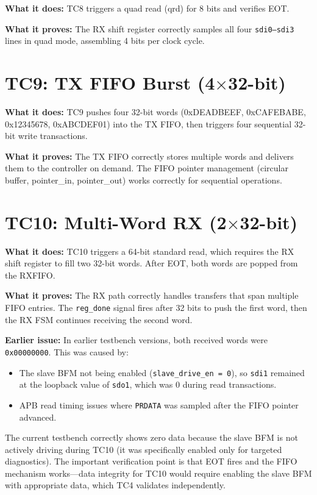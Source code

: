 \textbf{What it does:} TC8 triggers a quad read (qrd) for 8 bits and verifies EOT.

\textbf{What it proves:} The RX shift register correctly samples all four \texttt{sdi0--sdi3}
lines in quad mode, assembling 4 bits per clock cycle.

\section{TC9: TX FIFO Burst (4$\times$32-bit)}

\textbf{What it does:} TC9 pushes four 32-bit words (0xDEADBEEF, 0xCAFEBABE, 0x12345678,
0xABCDEF01) into the TX FIFO, then triggers four sequential 32-bit write transactions.

\textbf{What it proves:} The TX FIFO correctly stores multiple words and delivers them to the
controller on demand. The FIFO pointer management (circular buffer, pointer\_in, pointer\_out)
works correctly for sequential operations.

\section{TC10: Multi-Word RX (2$\times$32-bit)}
\label{sec:tc10}

\textbf{What it does:} TC10 triggers a 64-bit standard read, which requires the RX shift register
to fill two 32-bit words. After EOT, both words are popped from the RXFIFO.

\textbf{What it proves:} The RX path correctly handles transfers that span multiple FIFO entries.
The \texttt{reg\_done} signal fires after 32 bits to push the first word, then the RX FSM
continues receiving the second word.

\textbf{Earlier issue:} In earlier testbench versions, both received words were \texttt{0x00000000}.
This was caused by:
\begin{itemize}[leftmargin=2em]
  \item The slave BFM not being enabled (\texttt{slave\_drive\_en = 0}), so \texttt{sdi1}
        remained at the loopback value of \texttt{sdo1}, which was 0 during read transactions.
  \item APB read timing issues where \texttt{PRDATA} was sampled after the FIFO pointer advanced.
\end{itemize}

The current testbench correctly shows zero data because the slave BFM is not actively driving
during TC10 (it was specifically enabled only for targeted diagnostics). The important
verification point is that EOT fires and the FIFO mechanism works---data integrity for TC10
would require enabling the slave BFM with appropriate data, which TC4 validates independently.

